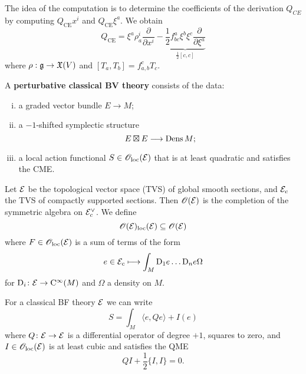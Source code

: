 The idea of the computation is to determine the coefficients of the derivation $Q_{CE}$ by computing $Q_{\text{CE}} x^i$ and $Q_{\text{CE}} \xi^a$.
We obtain
\begin{equation*}
  Q_{\text{CE}} = \xi^a \rho_a^i \frac{\partial}{\partial x^i}
  - \underbrace{\frac{1}{2} f_{bc}^a \xi^b \xi^c \frac{\partial}{\partial \xi^a}}_{\frac{1}{2} [c, c]}
\end{equation*}
where $\rho: \mathfrak{g} \to \mathfrak{X}(V)$ and $[T_a, T_b] = f_{a, b}^c T_c$.

\begin{definition}
  A \textbf{perturbative classical BV theory} consists of the data:
  \begin{enumerate}[i)]
    \item a graded vector bundle $E \to M$;
    \item a $-1$-shifted symplectic structure
    \begin{equation*}
      E \boxtimes E \longrightarrow \operatorname{Dens} M;
    \end{equation*}
    \item a local action functional $S \in \mathscr{O}_{\text{loc}}(\mathcal{E})$ that is at least quadratic and satisfies the CME.
  \end{enumerate}
  Let $\mathcal{E}$ be the topological vector space (TVS) of global smooth sections, and $\mathcal{E}_c$ the TVS of compactly supported sections.
  Then $\mathscr{O}(\mathcal{E})$ is the completion of the symmetric algebra on $\mathcal{E}_c^{\vee}$.
  We define
  \begin{equation*}
    \mathscr{O}(\mathcal{E})_{\text{loc}} (\mathcal{E}) \subseteq \mathscr{O}(\mathcal{E})
  \end{equation*}
  where $F \in \mathscr{O}_{\text{loc}} (\mathcal{E})$ is a sum of terms of the form
  \begin{equation*}
    e \in \mathcal{E}_c \longmapsto
    \int_M \mathrm{D}_1 e \dots \mathrm{D}_n e \Omega
  \end{equation*}
  for $\mathrm{D}_i \colon \mathcal{E} \to \mathrm{C}^{\infty} (M)$ and $\Omega$ a density on $M$.
\end{definition}

\begin{proposition}
  For a classical BF theory $\mathcal{E}$ we can write
  \begin{equation*}
    S = \int_M \langle e, Q e \rangle + I(e)
  \end{equation*}
  where $Q \colon \mathcal{E} \to \mathcal{E}$ is a differential operator of degree $+1$, squares to zero, and $I \in \mathscr{O}_{\text{loc}}(\mathcal{E})$ is at least cubic and satisfies the QME
  \begin{equation*}
    Q I + \frac{1}{2} \{ I, I \} = 0.
  \end{equation*}
\end{proposition}

